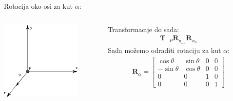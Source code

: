 \documentclass[9pt]{beamer}
\begin{document}
\begin{frame}{Rotacija oko osi za kut $\alpha$:}
	\begin{columns}
		\begin{column}{0.48\textwidth}
			\begin{center}
				\includegraphics[width=4cm]{./slike/p04_04.png}
			\end{center}
		\end{column}
		\begin{column}{0.48\textwidth}
			Transformacije do sada:
			\begin{align*}
			\mathbf{T}_{-P}\mathbf{R}_{y_{-\theta}}\mathbf{R}_{x_{\phi}}
			\end{align*}
			Sada možemo odraditi rotaciju za kut $\alpha$:
			\begin{align*}
			\mathbf{R}_{\alpha} =  \left[ \begin{array}{cccc}
			\cos\theta & \sin\theta & 0 & 0 \\
			-\sin\theta & \cos\theta & 0 & 0 \\
			0 & 0 & 1 & 0 \\
			0 & 0 & 0 & 1 
			\end{array} \right]
			\end{align*}
		\end{column}
	\end{columns}
\end{frame}
\end{document}
